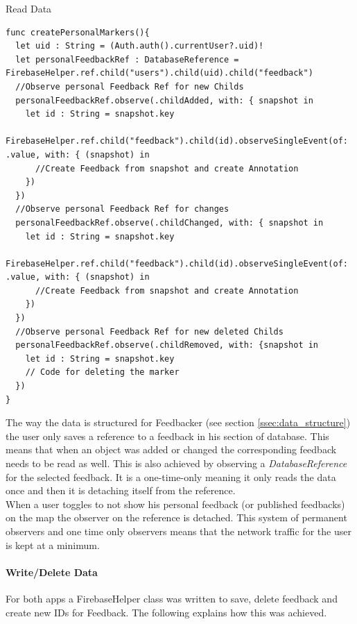\begin{listing}[H]
  \caption{Read Data}
  \label{mint:read_data}
  \begin{verbatim}
func createPersonalMarkers(){
  let uid : String = (Auth.auth().currentUser?.uid)!
  let personalFeedbackRef : DatabaseReference = FirebaseHelper.ref.child("users").child(uid).child("feedback")
  //Observe personal Feedback Ref for new Childs
  personalFeedbackRef.observe(.childAdded, with: { snapshot in
    let id : String = snapshot.key
    FirebaseHelper.ref.child("feedback").child(id).observeSingleEvent(of: .value, with: { (snapshot) in
      //Create Feedback from snapshot and create Annotation
    })
  })
  //Observe personal Feedback Ref for changes
  personalFeedbackRef.observe(.childChanged, with: { snapshot in
    let id : String = snapshot.key
    FirebaseHelper.ref.child("feedback").child(id).observeSingleEvent(of: .value, with: { (snapshot) in
      //Create Feedback from snapshot and create Annotation
    })
  })
  //Observe personal Feedback Ref for new deleted Childs
  personalFeedbackRef.observe(.childRemoved, with: {snapshot in
    let id : String = snapshot.key
    // Code for deleting the marker
  })
}
  \end{verbatim}
\end{listing}

The way the data is structured for Feedbacker (see section \ref{ssec:data_structure}) the user only saves a reference to a feedback in his section of database. This means that when an object was added or changed the corresponding feedback needs to be read as well. This is also achieved by observing a \textit{DatabaseReference} for the selected feedback. It is a one-time-only meaning it only reads the data once and then it is detaching itself from the reference.\\
When a user toggles to not show his personal feedback (or published feedbacks) on the map the observer on the reference is detached. This system of permanent observers and one time only observers means that the network traffic for the user is kept at a minimum.


\paragraph{Write/Delete Data}
For both apps a FirebaseHelper class was written to save, delete feedback and create new IDs for Feedback. The following explains how this was achieved.

